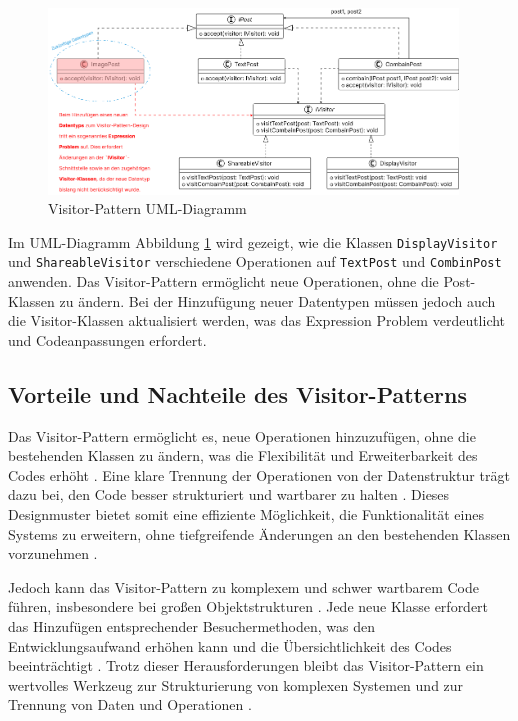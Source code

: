 \documentclass{easychair}
\begin{document}
    \begin{figure}[H]
      \begin{center}
        \includegraphics[width=0.97\textwidth]{Visitor-Pattern.png}
        \caption{Visitor-Pattern UML-Diagramm}
        \label{fig:VP}
      \end{center}
  \end{figure}

  \noindent Im UML-Diagramm Abbildung \ref{fig:VP} wird gezeigt, wie die Klassen \texttt{DisplayVisitor} und \texttt{ShareableVisitor} verschiedene Operationen auf \texttt{TextPost} und \texttt{CombinPost} anwenden. Das Visitor-Pattern ermöglicht neue Operationen, ohne die Post-Klassen zu ändern. Bei der Hinzufügung neuer Datentypen müssen jedoch auch die Visitor-Klassen aktualisiert werden, was das Expression Problem verdeutlicht und Codeanpassungen erfordert.


  \subsection*{Vorteile und Nachteile des Visitor-Patterns}

  Das Visitor-Pattern ermöglicht es, neue Operationen hinzuzufügen, ohne die bestehenden Klassen zu ändern, was die Flexibilität und Erweiterbarkeit des Codes erhöht \cite{gamma1994design}. Eine klare Trennung der Operationen von der Datenstruktur trägt dazu bei, den Code besser strukturiert und wartbarer zu halten \cite{Cook1990}. Dieses Designmuster bietet somit eine effiziente Möglichkeit, die Funktionalität eines Systems zu erweitern, ohne tiefgreifende Änderungen an den bestehenden Klassen vorzunehmen \cite{torgersen2004expression}.
  
  Jedoch kann das Visitor-Pattern zu komplexem und schwer wartbarem Code führen, insbesondere bei großen Objektstrukturen \cite{wadler1998expression}. Jede neue Klasse erfordert das Hinzufügen entsprechender Besuchermethoden, was den Entwicklungsaufwand erhöhen kann und die Übersichtlichkeit des Codes beeinträchtigt \cite{Reynolds1978}. Trotz dieser Herausforderungen bleibt das Visitor-Pattern ein wertvolles Werkzeug zur Strukturierung von komplexen Systemen und zur Trennung von Daten und Operationen \cite{hughes1989functional}.
\end{document}
